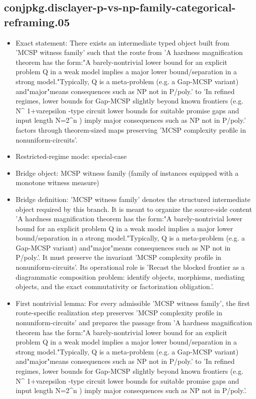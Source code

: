 \documentclass[11pt]{article}
\begin{document}
\subsection*{conjpkg.disclayer-p-vs-np-family-categorical-reframing.05}
\begin{itemize}
\item Exact statement: There exists an intermediate typed object built from 'MCSP witness family' such that the route from 'A hardness magnification theorem has the form:"A barely-nontrivial lower bound for an explicit problem Q in a weak model implies a major lower bound/separation in a strong model."Typically, Q is a meta-problem (e.g. a Gap-MCSP variant) and"major"means consequences such as NP not in P/poly.' to 'In refined regimes, lower bounds for Gap-MCSP slightly beyond known frontiers (e.g. N\textasciicircum{} 1+varepsilon -type circuit lower bounds for suitable promise gaps and input length N=2\textasciicircum{}n ) imply major consequences such as NP not in P/poly.' factors through theorem-sized maps preserving 'MCSP complexity profile in nonuniform-circuits'.
\item Restricted-regime mode: special-case
\item Bridge object: MCSP witness family (family of instances equipped with a monotone witness measure)
\item Bridge definition: 'MCSP witness family' denotes the structured intermediate object required by this branch. It is meant to organize the source-side content 'A hardness magnification theorem has the form:"A barely-nontrivial lower bound for an explicit problem Q in a weak model implies a major lower bound/separation in a strong model."Typically, Q is a meta-problem (e.g. a Gap-MCSP variant) and"major"means consequences such as NP not in P/poly.'. It must preserve the invariant 'MCSP complexity profile in nonuniform-circuits'. Its operational role is 'Recast the blocked frontier as a diagrammatic composition problem: identify objects, morphisms, mediating objects, and the exact commutativity or factorization obligation.'.
\item First nontrivial lemma: For every admissible 'MCSP witness family', the first route-specific realization step preserves 'MCSP complexity profile in nonuniform-circuits' and prepares the passage from 'A hardness magnification theorem has the form:"A barely-nontrivial lower bound for an explicit problem Q in a weak model implies a major lower bound/separation in a strong model."Typically, Q is a meta-problem (e.g. a Gap-MCSP variant) and"major"means consequences such as NP not in P/poly.' to 'In refined regimes, lower bounds for Gap-MCSP slightly beyond known frontiers (e.g. N\textasciicircum{} 1+varepsilon -type circuit lower bounds for suitable promise gaps and input length N=2\textasciicircum{}n ) imply major consequences such as NP not in P/poly.'.

\end{itemize}
\end{document}
